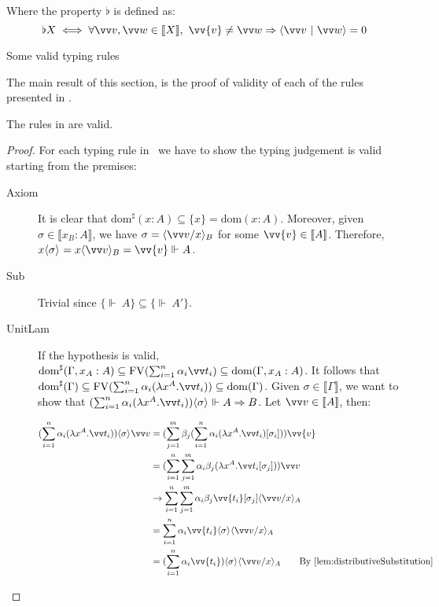 \documentclass[runningheads,orivec,envcountsame,envcountsect]{llncs}
\newcommand\ansubst[2]{\ensuremath{\langle #1 \rangle_{#2}}}
\newcommand\dom[1]{\mathrm{dom}(#1)}
\newcommand\sdom[1]{\mathrm{dom}^{\sharp}(#1)}
\newcommand\FV[1]{\mathrm{FV}(#1)}
\def\scal#1#2{\langle{#1}~|~{#2}\rangle}
\def\Lam#1#2#3{\lambda#1^{#2}{.}#3} %
\def\Arr{\Rightarrow}
\def\sem#1{\llbracket#1\rrbracket}
\def\semr#1{\{{\real}~#1\}}
\def\real{\Vdash}
\begin{document}
\begin{table}
    \parbox{\linewidth}{Where the property $\flat$ is defined as: 
    \[\flat X \iff \forall \vv v, \vv w\in\sem{X}, ~ \vv{v}\neq \vv w \Rightarrow \scal{\vv v}{\vv w} = 0
    \]
    }
    \caption{Some valid typing rules}
    \label{tab:TypingRules}
\end{table}

The main result of this section, is the proof of validity of each of the rules presented in .

\begin{theorem}
    The rules in  are valid.
\end{theorem}

\begin{proof}
    For each typing rule in ~we have to show the typing judgement is valid starting from the premises:
    \begin{description}
    \item[Axiom] It is clear that $\sdom{x:A}\subseteq\{x\}=\dom{x:A}$. Moreover, given $\sigma\in\sem{x_B:A}$, we have $\sigma=\ansubst{\vv v/x}{B}$ for some $\vv{v}\in\sem{A}$. Therefore, $x\ansubst{\sigma}{}=x\ansubst{\vv v}{B}=\vv{v}\real A$.
    
    \item[Sub] Trivial since $\semr{A}\subseteq\semr{A'}$. 

    \item[UnitLam] If the hypothesis is valid, $\sdom{\Gamma,x_A:A}\subseteq \FV{\sum_{i=1}^{n}\alpha_i \vv t_i}\subseteq \dom{\Gamma,x_A:A}$. It follows that $\sdom{\Gamma}\subseteq \FV{\sum_{i=1}^{n}\alpha_i (\Lam{x}{A}{\vv t_i})}\subseteq \dom{\Gamma}$. Given $\sigma\in\sem{\Gamma}$, we want to show that $(\sum_{i=1}^{n}\alpha_i (\Lam{x}{A}{\vv t_i}))\ansubst{\sigma}{}\real A\Arr B$. Let $\vv v\in\sem{A}$, then:
    
    \begin{align*}
        (\sum_{i=1}^{n} \alpha_i(\Lam{x}{A}{\vv t_i}))\ansubst{\sigma}{} \vv v&= (\sum_{j=1}^{m} \beta_j (\sum_{i=1}^{n} \alpha_i (\Lam{x}{A}{\vv t_i}) [\sigma_i])) \vv{v} \\
        &= (\sum_{i=1}^{n}\sum_{j=1}^{m}\alpha_i\beta_j (\Lam{x}{A}{\vv t_i[\sigma_j]}))\vv v\\
        &\to \sum_{i=1}^{n}\sum_{j=1}^{m}\alpha_i\beta_j \vv{t_i}[\sigma_j]\ansubst{\vv v/x}{A}\\
        &=\sum_{i=1}^{n}\alpha_i \vv{t_i}\ansubst{\sigma}{}\ansubst{\vv v/x}{A}\\
        &=(\sum_{i=1}^{n}\alpha_i \vv{t_i})\ansubst{\sigma}{}\ansubst{\vv v/x}{A}\qquad{\text{By \Cref{lem:distributiveSubstitution}}}
    \end{align*}
    

\end{description}
\end{proof}
\end{document}
